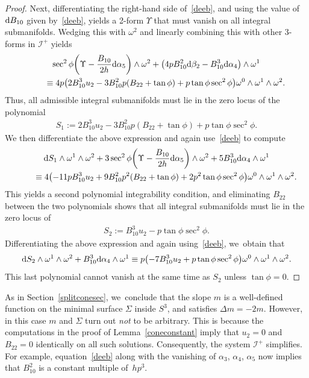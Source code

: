 \documentclass[pdftex]{sigma}
\def\calI{\mathcal{I}}
\def\w{\omega}
\numberwithin{equation}{section}
\begin{document}
\begin{proof}
Next, differentiating the right-hand side of~\eqref{deeb}, and using the value of ${\rm d}B_{10}$ given by~\eqref{deeb}, yields a 2-form $\Upsilon$ that must vanish on all integral submanifolds. Wedging this with $\w^2$ and linearly combining this with other 3-forms in $\calI^+$ yields
\begin{gather*}
\sec^2\phi \bigg(\Upsilon -\dfrac{B_{10}}{2h} {\rm d}\alpha_5\bigg)\wedge \w^2 + \big(4p B_{10}^2 {\rm d}\beta_2-B_{10}^3 {\rm d}\alpha_4\big) \wedge \w^1
\\ \qquad
{} \equiv 4p\big( 2B_{10}^3 u_2 -3B_{10}^2 p (B_{22}+\tan\phi) + p\tan\phi \sec^2\phi \big)\w^0 \wedge \w^1 \wedge \w^2.
\end{gather*}
Thus, all admissible integral submanifolds must lie in the zero locus of the polynomial
\begin{gather*}
S_1 := 2B_{10}^3 u_2 -3B_{10}^2 p (B_{22}+\tan\phi) + p\tan\phi \sec^2\phi.
\end{gather*}
We then differentiate the above expression and again use~\eqref{deeb} to compute
\begin{gather*}
{\rm d} S_1 \wedge \w^1 \wedge \w^2 + 3\sec^2\phi\bigg(\Upsilon -\dfrac{B_{10}}{2h} {\rm d}\alpha_5\bigg)\wedge \w^2 + 5B_{10}^3 {\rm d}\alpha_4 \wedge \w^1
\\ \qquad
{}\equiv 4\big({-}11 p B_{10}^3 u_2+9 B_{10}^2 p^2 (B_{22}+\tan\phi)+2 p^2 \tan\phi \sec^2\phi \big)\w^0 \wedge \w^1 \wedge \w^2.
\end{gather*}
This yields a second polynomial integrability condition, and eliminating $B_{22}$ between the two polynomials shows that all integral submanifolds must lie in the zero locus of
\begin{gather*}
S_2:= B_{10}^3 u_2 - p\tan\phi \sec^2\phi.
\end{gather*}
Differentiating the above expression and again using~\eqref{deeb}, we~obtain that
\begin{gather*}
{\rm d}S_2 \wedge \w^1 \wedge \w^2 +B_{10}^3 {\rm d}\alpha_4 \wedge \w^1 \equiv p\big({-}7B_{10}^3 u_2 + p\tan\phi \sec^2\phi\big)\w^0 \wedge \w^1 \wedge \w^2.
\end{gather*}
This last polynomial cannot vanish at the same time as $S_2$ unless $\tan\phi=0$.
\end{proof}

As in Section~\ref{splitconesec}, we~conclude that the slope $m$ is a well-defined function on the minimal surface $\Sigma$ inside $S^3$, and satisfies $\Delta m = -2m$. However, in this case $m$ and $\Sigma$ turn out \emph{not} to be arbitrary. This is because the computations in the proof of Lemma~\ref{coneconstant} imply that $u_2=0$ and $B_{22}=0$ identically on all such solutions. Consequently, the system $\calI^+$ simplifies. For example, equation~\eqref{deeb} along with the vanishing of $\alpha_3$, $\alpha_4$, $\alpha_5$ now implies that $B_{10}^2$ is a constant multiple of~$hp^3$.
\end{document}
